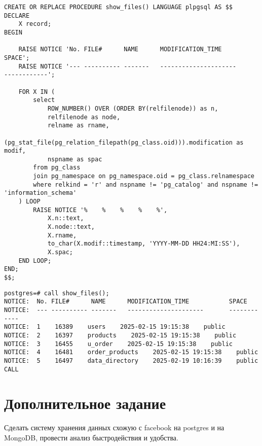 \documentclass{article}
\begin{document}
\begin{lstlisting}[caption={script.sql}, label={lst:example}]
CREATE OR REPLACE PROCEDURE show_files() LANGUAGE plpgsql AS $$
DECLARE
    X record;
BEGIN

    RAISE NOTICE 'No. FILE#      NAME      MODIFICATION_TIME           SPACE';
    RAISE NOTICE '--- ---------- -------   ---------------------       ------------';

    FOR X IN (
        select 
            ROW_NUMBER() OVER (ORDER BY(relfilenode)) as n, 
            relfilenode as node, 
            relname as rname, 
            (pg_stat_file(pg_relation_filepath(pg_class.oid))).modification as modif, 
            nspname as spac
        from pg_class 
        join pg_namespace on pg_namespace.oid = pg_class.relnamespace 
        where relkind = 'r' and nspname != 'pg_catalog' and nspname != 'information_schema'
    ) LOOP
        RAISE NOTICE '%    %    %    %    %',
            X.n::text,
            X.node::text,
            X.rname,
            to_char(X.modif::timestamp, 'YYYY-MM-DD HH24:MI:SS'),
            X.spac;
    END LOOP;
END;
$$;
\end{lstlisting}

\begin{lstlisting}[caption={kitty}, label={lst:example}]
postgres=# call show_files();
NOTICE:  No. FILE#      NAME      MODIFICATION_TIME           SPACE
NOTICE:  --- ---------- -------   ---------------------       ------------
NOTICE:  1    16389    users    2025-02-15 19:15:38    public
NOTICE:  2    16397    products    2025-02-15 19:15:38    public
NOTICE:  3    16455    u_order    2025-02-15 19:15:38    public
NOTICE:  4    16481    order_products    2025-02-15 19:15:38    public
NOTICE:  5    16497    data_directory    2025-02-19 10:16:39    public
CALL
\end{lstlisting}

\section*{Дополнительное задание}

Сделать систему хранения данных схожую с facebook на postgres и на MongoDB, провести анализ быстродействия и удобства.
\end{document}
